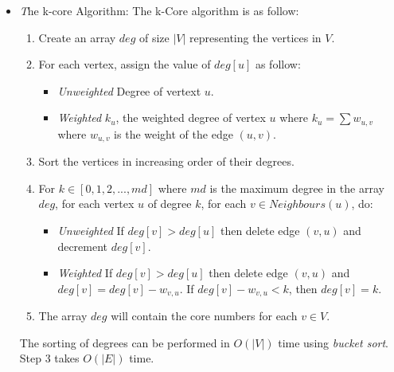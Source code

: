 \begin{itemize}
\begin{itemize}
    \item{\textit The k-core Algorithm:}
    The k-Core algorithm is as follow:
    \begin{enumerate}
        \item Create an array $deg$ of size $|V|$ representing the vertices in $V$.
        \item For each vertex, assign the value of $deg[u]$ as follow:
        \begin{itemize}
            \item{\textit{Unweighted}}
            Degree of vertext $u$.
            \item{\textit{Weighted}} 
            $k_u$, the weighted degree of vertex $u$ where $k_u = \sum w_{u,v}$ where $w_{u,v}$ is the weight of the edge $(u,v)$.
        \end{itemize}
        \item Sort the vertices in increasing order of their degrees.
        \item For $k \in [0,1,2,...,md]$ where $md$ is the maximum degree in the array $deg$, for each vertex $u$ of degree $k$, for each $v \in Neighbours(u)$, do:
        \begin{itemize}
            \item{\textit{Unweighted}}
            If $deg[v] > deg[u]$ then delete edge $(v,u)$ and decrement $deg[v]$.
            \item{\textit{Weighted}}
            If $deg[v] > deg[u]$ then delete edge $(v,u)$ and $deg[v] = deg[v] - w_{v,u}$.
            \newline If $deg[v] - w_{v,u} < k$, then  $deg[v] = k$.
        \end{itemize}
        \item The array $deg$ will contain the core numbers for each $v \in V$.
    \end{enumerate}
    The sorting of degrees can be performed in $O(|V|)$ time using \textit{bucket sort}. Step 3 takes $O(|E|)$ time.
\end{itemize}
\end{itemize}


